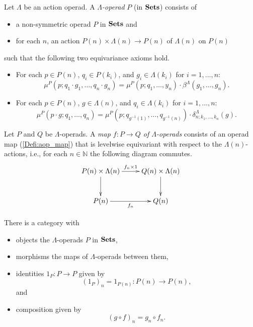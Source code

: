 \begin{Defi}\label{Defi:lamop}
  Let $\Lambda$ be an action operad. A \textit{$\Lambda$-operad} $P$ (in $\mathbf{Sets}$) consists of
    \begin{itemize}
      \item a non-symmetric operad $P$ in $\mathbf{Sets}$ and
      \item for each $n$, an action $P(n) \times \Lambda(n) \rightarrow P(n)$ of $\Lambda(n)$ on $P(n)$
    \end{itemize}
such that the following two equivariance axioms hold.
  \begin{itemize}
    \item For each $p \in P(n)$, $q_i \in P(k_i)$, and $g_i \in \Lambda(k_i)$ for $i=1, \ldots, n$:
  \[
    \mu^{P}(p; q_{1} \cdot g_{1}, \ldots, q_{n} \cdot g_{n}) = \mu^{P}(p; q_{1}, \ldots, y_{n}) \cdot \beta^{\Lambda}(g_{1}, \ldots, g_{n}).
  \]
    \item For each $p \in P(n)$, $g \in \Lambda(n)$, and $q_i \in \Lambda(k_i)$ for $i=1, \ldots, n$:
  \[
    \mu^{P}(p \cdot g; q_{1}, \ldots, q_{n}) = \mu^{P}\left(p; q_{g^{-1}(1)}, \ldots, q_{g^{-1}(n)}\right) \cdot \delta_{n;k_1,\ldots,k_n}^{\Lambda}(g).
  \]
  \end{itemize}
\end{Defi}


\begin{Defi}\label{Defi:aop_map}
Let $P$ and $Q$ be $\Lambda$-operads. A \emph{map $f \colon P \rightarrow Q$ of $\Lambda$-operads} consists of an operad map (\ref{Defi:aop_map}) that is levelwise equivariant with respect to the $\Lambda(n)$-actions, i.e., for each $n \in \mathbb{N}$ the following diagram commutes.
  \[
    \xy
      (0,0)*+{P(n) \times \Lambda(n)}="00";
      (30,0)*+{Q(n) \times \Lambda(n)}="10";
      (30,-15)*+{Q(n)}="11";
      (0,-15)*+{P(n)}="01";
      {\ar^{f_n \times 1} "00";"10"};
      {\ar "10";"11"};
      {\ar "00";"01"};
      {\ar_{f_n} "01";"11"};
    \endxy
  \]
\end{Defi}

\begin{prop}\label{prop:cat-of-L-op}
There is a category with 
\begin{itemize}
\item objects the $\Lambda$-operads $P$ in $\mathbf{Sets}$, 
\item morphisms the maps of $\Lambda$-operads between them,
\item identities $1_P \colon P \to P$ given by
\[
(1_P)_n = 1_{P(n)} \colon P(n) \to P(n),
\]
and
\item composition given by
\[
(g \circ f)_n = g_n \circ f_n.
\]
\end{itemize}
\end{prop}

